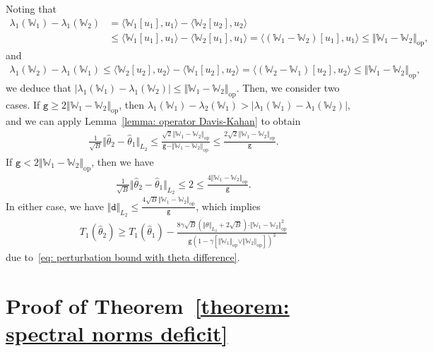 \documentclass[11pt]{article}
\newcommand{\op}{\mathrm{op}}
\newcommand{\bbW}{\mathbb{W}}
\newcommand{\<}{\langle}
\renewcommand{\>}{\rangle}
\newcommand{\ttd}{\mathtt{d}}
\newcommand{\ttg}{\mathtt{g}}
\theoremstyle{plain}
\theoremstyle{definition}
\theoremstyle{remark}
\begin{document}
{Noting that
\begin{align*}
    \lambda_1(\bbW_1) - \lambda_1(\bbW_2) & = \langle \bbW_1[u_1], u_1 \rangle - \langle \bbW_2[u_2], u_2 \rangle \\
    & \le \langle \bbW_1[u_1], u_1 \rangle - \langle \bbW_2[u_1], u_1 \rangle = \langle (\bbW_1 - \bbW_2)[u_1], u_1 \rangle \le \Vert \bbW_1 - \bbW_2 \Vert_{\op},
\end{align*}
and
\begin{align*}
    \lambda_1(\bbW_2) - \lambda_1(\bbW_1) \le \langle \bbW_2[u_2], u_2 \rangle - \langle \bbW_1[u_2], u_2 \rangle = \langle (\bbW_2 - \bbW_1)[u_2], u_2 \rangle \le \Vert \bbW_1 - \bbW_2 \Vert_{\op},
\end{align*}
we deduce that $| \lambda_1(\bbW_1) - \lambda_1(\bbW_2)| \le \Vert\bbW_1 - \bbW_2 \Vert_{\op}$. Then, we consider two cases. If $\ttg \ge 2 \Vert \bbW_1 - \bbW_2 \Vert_{\op}$, then $\lambda_1(\bbW_1) - \lambda_2(\bbW_1) > |\lambda_1(\bbW_1) - \lambda_1(\bbW_2)|$, and we can apply Lemma~\ref{lemma: operator Davis-Kahan} to obtain
\begin{align*}
    \frac{1}{\sqrt{B}} \Vert \hat{\theta}_2 - \hat{\theta}_1 \Vert_{L_2} \le \frac{\sqrt{2} \Vert \bbW_1 - \bbW_2 \Vert_{\op}}{\ttg - \Vert \bbW_1 - \bbW_2 \Vert_{\op}} \le \frac{2 \sqrt{2} \Vert \bbW_1 - \bbW_2 \Vert_{\op}}{\ttg}.
\end{align*}
If $\ttg < 2 \Vert \bbW_1 - \bbW_2 \Vert_{\op}$, then we have 
\begin{align*}
    \frac{1}{\sqrt{B}} \Vert \hat{\theta}_2 - \hat{\theta}_1 \Vert_{L_2} \le 2 \le \frac{4\Vert \bbW_1 - \bbW_2 \Vert_{\op}}{\ttg}.
\end{align*}
In either case, we have $\Vert \ttd \Vert_{L_2} \le \frac{4 \sqrt{B} \Vert \bbW_1 - \bbW_2 \Vert_{\op}}{\ttg}$, which implies
\begin{align*}
    T_1(\hat{\theta}_2) \ge T_1(\hat{\theta}_1) - \frac{8 \gamma \sqrt{B} (\Vert \theta \Vert_{L_2} + 2 \sqrt{B}) \cdot \Vert \bbW_1 - \bbW_2 \Vert_{\op}^2}{\ttg (1 - \gamma [\Vert \bbW_1 \Vert_{\op} \vee \Vert \bbW_  2 \Vert_{\op}])^3}
\end{align*}
due to~\eqref{eq: perturbation bound with theta difference}.

 

\section{Proof of Theorem~\ref{theorem: spectral norms deficit}}
\label{appendix: proof of deficit lower bound theorem}

}
\end{document}
